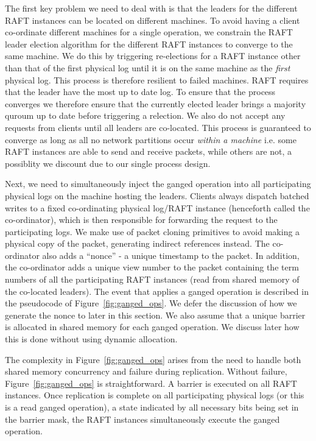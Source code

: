 \documentclass[pageno]{jpaper}
\begin{document}
The first key problem we need to deal with is that the leaders for the different
RAFT instances can be located on different machines. To avoid having a client
co-ordinate different machines for a single operation, we constrain the RAFT
leader election algorithm for the different RAFT instances to converge to the
same machine. We do this by triggering re-elections for a RAFT instance other
than that of the first physical log until it is on the same machine as the
\emph{first} physical log. This process is therefore resilient to failed
machines. RAFT requires that the leader have the most up to date log. To ensure
that the process converges we therefore ensure that the currently elected leader
brings a majority quroum up to date before triggering a relection. We also do
not accept any requests from clients until all leaders are co-located. This
process is guaranteed to converge as long as all no network partitions occur
\emph{within a machine} i.e. some RAFT instances are able to send and receive
packets, while others are not, a possiblity we discount due to our single
process design.

Next, we need to simultaneously inject the ganged operation into all
participating physical logs on the machine hosting the leaders. Clients always
dispatch batched writes to a fixed co-ordinating physical log/RAFT instance
(henceforth called the co-ordinator), which is then responsible for forwarding
the request to the participating logs. We make use of packet cloning primitives
to avoid making a physical copy of the packet, generating indirect references
instead. The co-ordinator also adds a ``nonce'' - a unique timestamp to the
packet. In addition, the co-ordinator adds a unique view number to the packet
containing the term numbers of all the participating RAFT instances (read from
shared memory of the co-located leaders).  The event that applies a ganged
operation is described in the pseudocode of Figure~\ref{fig:ganged_ops}. We
defer the discussion of how we generate the nonce to later in this section. We
also assume that a unique barrier is allocated in shared memory for each ganged
operation. We discuss later how this is done without using dynamic allocation.

The complexity in Figure~\ref{fig:ganged_ops} arises from the need to handle
both shared memory concurrency and failure during replication. Without failure,
Figure~\ref{fig:ganged_ops} is straightforward. A barrier is executed on all
RAFT instances. Once replication is complete on all participating physical logs
(or this is a read ganged operation), a state indicated by all necessary bits
being set in the barrier mask, the RAFT instances simultaneously execute the
ganged operation.
\end{document}
